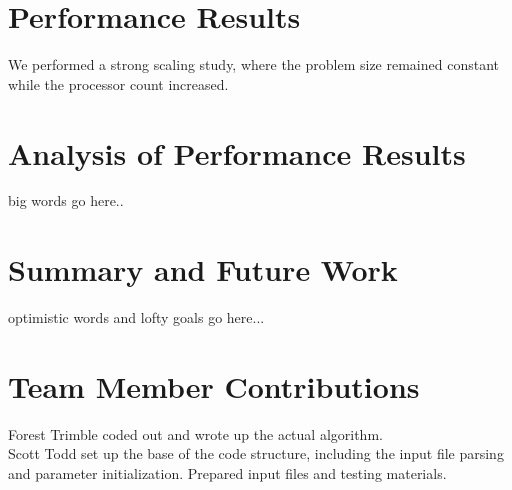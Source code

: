 \documentclass[twocolumn]{article}
\begin{document}
\section{Performance Results}

We performed a strong scaling study, where the problem size remained constant
while the processor count increased.\\


\section{Analysis of Performance Results}

big words go here..\\


\section{Summary and Future Work}

optimistic words and lofty goals go here...\\

\section{Team Member Contributions}

\noindent Forest Trimble coded out and wrote up the actual algorithm.  \\

\noindent Scott Todd set up the base of the code structure, including the input
file parsing and parameter initialization. Prepared input files and testing
materials.

\nocite{*}


\end{document}
